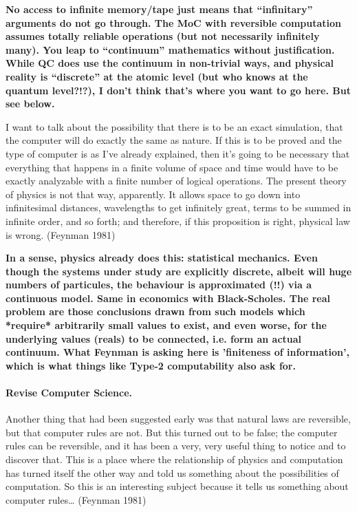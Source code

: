 \documentclass[12pt]{article}
\newcommand{\jc}[1]{\fbox{Jacques says:} \textbf{#1}}
\begin{document}
\jc{No access to infinite memory/tape just means that ``infinitary''
arguments do not go through. The MoC with reversible computation 
assumes totally reliable operations (but not necessarily infinitely
many). You leap to ``continuum'' mathematics without justification.
While QC does use the continuum in non-trivial ways, and physical
reality is ``discrete'' at the atomic level (but who knows at the
quantum level?!?), I don't think that's where you want to go here.
But see below.}

I want to talk about the possibility that there is to be an exact
simulation, that the computer will do exactly the same as nature. If
this is to be proved and the type of computer is as I've already
explained, then it's going to be necessary that everything that
happens in a finite volume of space and time would have to be exactly
analyzable with a finite number of logical operations. The present
theory of physics is not that way, apparently. It allows space to go
down into infinitesimal distances, wavelengths to get infinitely
great, terms to be summed in infinite order, and so forth; and
therefore, if this proposition is right, physical law is wrong.
(Feynman 1981)

\jc{In a sense, physics already does this: statistical mechanics.
Even though the systems under study are explicitly discrete, albeit
will huge numbers of particules, the behaviour is approximated (!!)
via a continuous model. Same in economics with Black-Scholes.
The real problem are those conclusions drawn from such models which
*require* arbitrarily small values to exist, and even worse, for
the underlying values (reals) to be connected, i.e. form an actual
continuum. What Feynman is asking here is 'finiteness of information',
which is what things like Type-2 computability also ask for.}

\paragraph*{Revise Computer Science.}

Another thing that had been suggested early was that natural laws are
reversible, but that computer rules are not. But this turned out to be
false; the computer rules can be reversible, and it has been a very,
very useful thing to notice and to discover that. This is a place
where the relationship of physics and computation has turned itself
the other way and told us something about the possibilities of
computation. So this is an interesting subject because it tells us
something about computer rules…  (Feynman 1981)
\end{document}
